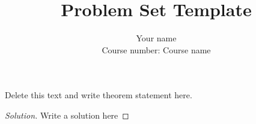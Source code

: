 \documentclass[10pt]{article}
\newenvironment{problem}[2][Problem]{\begin{trivlist}
\item[\hskip \labelsep {\bfseries #1}\hskip \labelsep {\bfseries #2.}]}{\end{trivlist}}
\begin{document}
 
\title{Problem Set Template}
\author{Your name\\
Course number: Course name}
\maketitle
 
\begin{problem}{1.1}
Delete this text and write theorem statement here.
\end{problem}

\begin{proof}[Solution]
Write a solution here

\end{proof}
\end{document}

